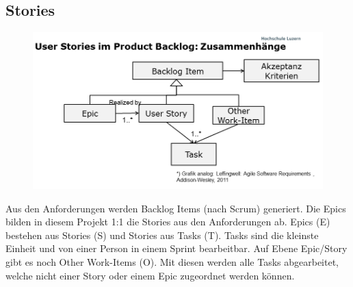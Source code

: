 \documentclass[a4paper, 10pt, fleqn]{article}
\begin{document}
\subsection{Stories}
\begin{figure}[h!]
    \center
    \includegraphics[width=\textwidth]{fig/stories.png}
\end{figure}
Aus den Anforderungen werden Backlog Items (nach Scrum) generiert. Die Epics 
bilden in diesem Projekt 1:1 die Stories aus den Anforderungen ab. Epics (E) 
bestehen aus Stories (S) und Stories aus Tasks (T). Tasks sind die kleinste 
Einheit und von einer Person in einem Sprint bearbeitbar. Auf Ebene Epic/Story 
gibt es noch Other Work-Items (O). Mit diesen werden alle Tasks abgearbeitet, 
welche nicht einer Story oder einem Epic zugeordnet werden können.
\end{document}
